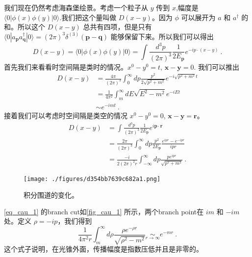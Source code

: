 
我们现在仍然考虑海森堡绘景。考虑一个粒子从 $y$ 传到 $x$,幅度是 $\langle 0 |\phi(x)\phi(y)| 0 \rangle$.我们把这个量叫做 $D(x-y)$。因为 $\phi$ 可以展开为 $a$ 和 $a^\dagger$ 的和。所以这个 $D(x-y)$ 总共有四项，但是只有 $\langle 0 | a_{\mathbf p} a^\dagger_{\mathbf q} | 0 \rangle = (2\pi)^3 \delta^{(3)}(\mathbf p - \mathbf q)$ 能够保留下来。所以我们可以得出
\begin{equation}
D(x-y)=\langle 0|\phi(x) \phi(y)| 0\rangle=\int \frac{d^{3} p}{(2 \pi)^{3}} \frac{1}{2 E_{\mathbf{p}}} e^{-i p \cdot(x-y)}~.
\end{equation}
首先我们来看看时空间隔是类时的情况。$x^0 - y^0 = t$, $\mathbf x - \mathbf y = 0$. 我们可以推出
\begin{equation}
\begin{aligned}
D(x-y) &=\frac{4 \pi}{(2 \pi)^{3}} \int_{0}^{\infty} d p \frac{p^{2}}{2 \sqrt{p^{2}+m^{2}}} e^{-i \sqrt{p^{2}+m^{2}} t} \\
&=\frac{1}{4 \pi^{2}} \int_{m}^{\infty} d E \sqrt{E^{2}-m^{2}} e^{-i E t} \\
& \sim e^{-i m t}~.
\end{aligned}
\end{equation}
接着我们可以考虑时空间隔是类空的情况 $x^0 - y^0 = 0$, $\mathbf x - \mathbf y = \mathbf r$。
\begin{equation}\label{eq_cau_1}
\begin{aligned}
D(x-y) &=\int \frac{d^{3} p}{(2 \pi)^{3}} \frac{1}{2 E_{\mathbf{p}}} e^{i \mathbf{p} \cdot \mathbf{r}} \\
&=\frac{2 \pi}{(2 \pi)^{3}} \int_{0}^{\infty} d p \frac{p^{2}}{2 E_{\mathbf{p}}} \frac{e^{i p r}-e^{-i p r}}{i p r} \\
&=\frac{-i}{2(2 \pi)^{2} r} \int_{-\infty}^{\infty} d p \frac{p e^{i p r}}{\sqrt{p^{2}+m^{2}}}~.
\end{aligned}
\end{equation}
\begin{figure}[ht]
\centering
\texttt{[image: ./figures/d354bb7639c682a1.png]}
\caption{积分围道的变化。} \label{fig_cau_1}
\end{figure}
\autoref{eq_cau_1} 的branch cut如\autoref{fig_cau_1} 所示，两个branch point在 $im$ 和 $-im$ 处。定义 $\rho = -ip$，我们得到
\begin{equation}
\frac{1}{4 \pi^{2} r} \int_{m}^{\infty} d \rho \frac{\rho e^{-\rho r}}{\sqrt{\rho^{2}-m^{2}}} \underset{r \rightarrow \infty}{\sim} e^{-m r}~.
\end{equation}
这个式子说明，在光锥外面，传播幅度是指数压低并且是非零的。

